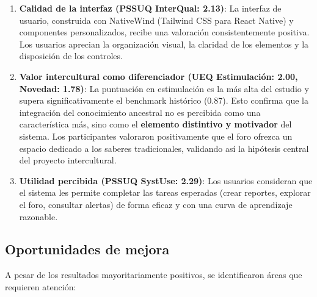 \documentclass[a4paper,12pt]{report}
\begin{document}
\begin{enumerate}
    \item \textbf{Calidad de la interfaz (PSSUQ InterQual: 2.13)}: La interfaz de usuario, construida con NativeWind (Tailwind CSS para React Native) y componentes personalizados, recibe una valoración consistentemente positiva. Los usuarios aprecian la organización visual, la claridad de los elementos y la disposición de los controles.

    \item \textbf{Valor intercultural como diferenciador (UEQ Estimulación: 2.00, Novedad: 1.78)}: La puntuación en estimulación es la más alta del estudio y supera significativamente el benchmark histórico (0.87). Esto confirma que la integración del conocimiento ancestral no es percibida como una característica más, sino como el \textbf{elemento distintivo y motivador} del sistema. Los participantes valoraron positivamente que el foro ofrezca un espacio dedicado a los saberes tradicionales, validando así la hipótesis central del proyecto intercultural.

    \item \textbf{Utilidad percibida (PSSUQ SystUse: 2.29)}: Los usuarios consideran que el sistema les permite completar las tareas esperadas (crear reportes, explorar el foro, consultar alertas) de forma eficaz y con una curva de aprendizaje razonable.
\end{enumerate}

\subsection{Oportunidades de mejora}

A pesar de los resultados mayoritariamente positivos, se identificaron áreas que requieren atención:
\end{document}
